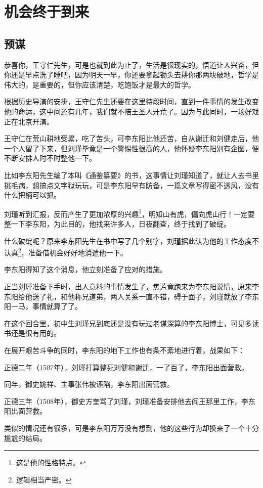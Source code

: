 \section{机会终于到来}
\ifnum{}
	\begin{multicols}{\theparacolNo}
\fi
\subsection{预谋}
恭喜你，王守仁先生，可是也就到此为止了，生活是很现实的，悟道让人兴奋，但你还是早点洗了睡吧，因为明天一早，你还要拿起锄头去耕你那两块破地，哲学是伟大的，是重要的，但你应该清楚，吃饱饭才是最大的哲学。

根据历史导演的安排，王守仁先生还要在这里待段时间，直到一件事情的发生改变他的命运，这中间还有几年，我们就不陪王圣人开荒了。因为与此同时，一场好戏正在北京开演。

王守仁在荒山耕地受累，吃了苦头，可李东阳比他还苦，自从谢迁和刘健走后，他一个人留了下来，但刘瑾毕竟是一个警惕性很高的人，他怀疑李东阳别有企图，便不断安排人时不时整他一下。

比如李东阳先生编了本叫《通鉴纂要》的书，这事情让刘瑾知道了，就让人去书里挑毛病，想搞点文字狱玩玩，可是李东阳早有防备，一篇文章写得密不透风，没有什么把柄可以抓。

刘瑾听到汇报，反而产生了更加浓厚的兴趣\footnote{这是他的性格特点。}，明知山有虎，偏向虎山行！一定要整一下李东阳，为此目的，他找来许多人，日夜翻查，终于找到了破绽。

什么破绽呢？原来李东阳先生在书中写了几个别字，刘瑾据此认为他的工作态度不认真\footnote{逻辑相当严密。}，准备借机会好好地消遣他一下。

李东阳得知了这个消息，他立刻准备了应对的措施。

正当刘瑾准备下手时，出人意料的事情发生了，焦芳竟跑来为李东阳说情，原来李东阳给他送了礼，和他称兄道弟，两人关系一直不错，碍于面子，刘瑾就放了李东阳一马，事情就算了了。

在这个回合里，初中生刘瑾兄到底还是没有玩过老谋深算的李东阳博士，可见多读书还是很有用的。

在展开艰苦斗争的同时，李东阳的地下工作也有条不紊地进行着，战果如下：

正德二年（1507年），刘瑾打算整死刘健和谢迁，一了百了，李东阳出面营救。

同年，御史姚祥、主事张伟被诬陷，李东阳出面营救。

正德三年（1508年），御史方奎骂了刘瑾，刘瑾准备安排他去阎王那里工作，李东阳出面营救。

类似的情况还有很多，可是李东阳万万没有想到，他的这些行为却换来了一个十分尴尬的结局。


\end{multicols}
